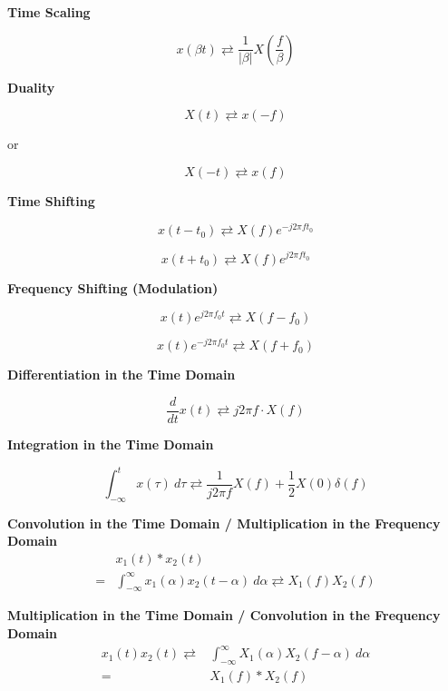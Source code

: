\documentclass[landscape,a4paper]{extarticle}
\begin{document}
\begin{multicols*}{5}
    \textbf{Time Scaling}

    \[
        x(\beta t) \rightleftarrows \frac{1}{|\beta|} X\left( \frac{f}{\beta}\right) \tag{4.3}
    \]

    \textbf{Duality}

    \[
        X(t) \rightleftarrows x(-f) \tag{4.4}
    \]

    \centerline{or}

    \[
        X(-t) \rightleftarrows x(f)
    \]

    \textbf{Time Shifting}

    \[
        x(t-t_0) \rightleftarrows X(f)e^{-j2\pi ft_0} \tag{4.5}
    \]

    \[
        x(t+t_0) \rightleftarrows X(f)e^{j 2 \pi f t_0}
    \]

    \textbf{Frequency Shifting (Modulation)}

    \[
        x(t)e^{j2\pi f_0t} \rightleftarrows X(f-f_0) \tag{4.6}
    \]

    \[
        x(t)e^{-j2\pi f_0t} \rightleftarrows X(f+f_0)
    \]

    \textbf{Differentiation in the Time Domain}

    \[
        \frac{d}{dt}x(t) \rightleftarrows j2\pi f \cdot X(f) \tag{4.7}
    \]

    \textbf{Integration in the Time Domain}

    \[
        \int_{-\infty}^{t}x(\tau)\ d\tau \rightleftarrows \frac{1}{j2\pi f}X(f) + \frac{1}{2}X(0)\delta(f) \tag{4.8}
    \]

    \textbf{Convolution in the Time Domain / Multiplication in the Frequency Domain}
    \begin{align*}
        &x_1(t) * x_2(t) \\
        = &\int_{-\infty}^{\infty}x_1(\alpha)x_2(t-\alpha)\ d\alpha \rightleftarrows X_1(f)X_2(f) \tag{4.9a}
    \end{align*}

    \textbf{Multiplication in the Time Domain / Convolution in the Frequency Domain} 
    \begin{align*}
        x_1(t)x_2(t) \rightleftarrows &\int_{-\infty}^{\infty} X_1(\alpha)X_2(f-\alpha)\ d\alpha \\=&X_1(f)*X_2(f) \tag{4.9b}
    \end{align*}


\end{multicols*}
\end{document}
